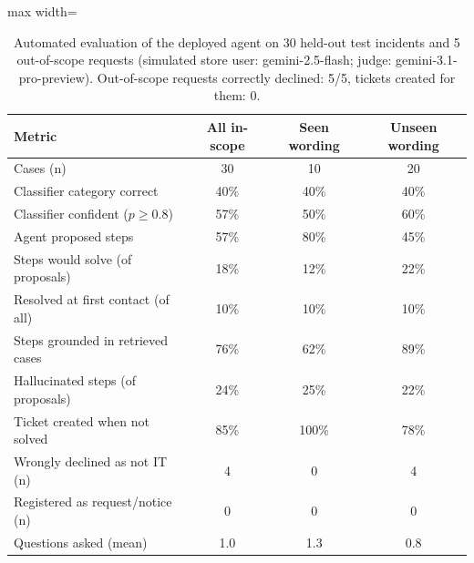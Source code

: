 \begin{table}[!t]
\centering
\caption{Automated evaluation of the deployed agent on 30 held-out test incidents and 5 out-of-scope requests (simulated store user: gemini-2.5-flash; judge: gemini-3.1-pro-preview). Out-of-scope requests correctly declined: 5/5, tickets created for them: 0.}
\label{tab:agent_eval_v1}
\footnotesize
\begin{adjustbox}{max width=\columnwidth}
\begin{tabular}{lccc}
\hline
Metric & All in-scope & Seen wording & Unseen wording \\
\hline
Cases (n) & 30 & 10 & 20 \\
Classifier category correct & 40\% & 40\% & 40\% \\
Classifier confident ($p\ge0.8$) & 57\% & 50\% & 60\% \\
Agent proposed steps & 57\% & 80\% & 45\% \\
Steps would solve (of proposals) & 18\% & 12\% & 22\% \\
Resolved at first contact (of all) & 10\% & 10\% & 10\% \\
Steps grounded in retrieved cases & 76\% & 62\% & 89\% \\
Hallucinated steps (of proposals) & 24\% & 25\% & 22\% \\
Ticket created when not solved & 85\% & 100\% & 78\% \\
Wrongly declined as not IT (n) & 4 & 0 & 4 \\
Registered as request/notice (n) & 0 & 0 & 0 \\
Questions asked (mean) & 1.0 & 1.3 & 0.8 \\
\hline
\end{tabular}
\end{adjustbox}
\end{table}
